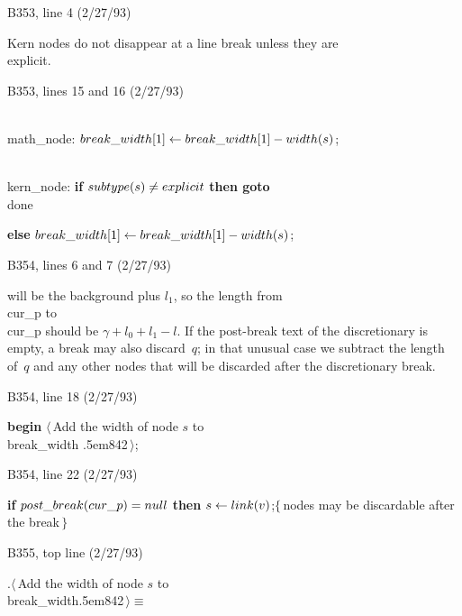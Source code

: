 \bugonpage B353, line 4 (2/27/93)

\tenpoint\noindent\hskip10pt
Kern nodes do not disappear at a line break unless they are \\{explicit}.

\bugonpage B353, lines 15 and 16 (2/27/93)

\ninepoint\noindent\hskip20pt
\\{math\_node}: $\\{break\_width}[1]\gets\\{break\_width}[1]-\\{width}(s)$;\par
\noindent\hskip20pt
\\{kern\_node}: {\bf if\/} $\\{subtype}(s)\ne\\{explicit}$
  {\bf then goto} \\{done}\par\noindent\hskip30pt
{\bf else} $\\{break\_width}[1]\gets\\{break\_width}[1]-\\{width}(s)$;

\bugonpage B354, lines 6 and 7 (2/27/93)

\tenpoint\noindent
will be the background
plus $l_1$, so the length from \\{cur\_p} to \\{cur\_p} should be
$\gamma+l_0+l_1-l$.
If the post-break text of the discretionary is empty, a break may also
discard~$q$; in that unusual case we subtract the length of~$q$ and any
other nodes that will be discarded after the discretionary break.

\bugonpage B354, line 18 (2/27/93)

\ninepoint\noindent\hskip20pt
{\bf begin} $\langle\,$Add the width of node $s$ to \\{break\_width}{\sevenrm
  \kern.5em842}$\,\rangle$;

\bugonpage B354, line 22 (2/27/93)

\ninepoint\noindent\hskip10pt
{\bf if\/} $\\{post\_break}(\\{cur\_p})=\\{null}$ {\bf then}
  $s\gets\\{link}(v)$;\quad$\{\,$nodes may be discardable after the break$\,\}$

\bugonpage B355, top line (2/27/93)

\ninepoint\noindent
{.\quad}$\langle\,$Add the width of node $s$ to
 \\{break\_width}{\sevenrm\kern.5em842}$\,\rangle\equiv$

